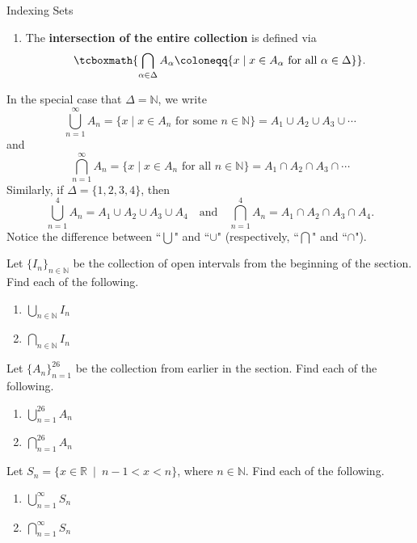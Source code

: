\begin{section}{Indexing Sets}
\begin{definition}
\begin{enumerate}[label=\textrm{(\alph*)}]
\item The \textbf{intersection of the entire collection} is defined via
\[
\tcboxmath{\bigcap_{\alpha\in\Delta} A_{\alpha}\coloneqq \{x\mid x\in A_{\alpha} \mbox{ for all }\alpha\in \Delta\}}.
\]
\end{enumerate}
\end{definition}

In the special case that $\Delta=\mathbb{N}$, we write
\[
\bigcup_{n=1}^{\infty}A_n= \{ x \mid  x \in A_n \mbox{ for some } n \in \mathbb{N}\}= A_1\cup A_2 \cup A_3 \cup \cdots
\] 
and
\[
\bigcap_{n=1}^{\infty}A_n= \{ x \mid  x \in A_n \mbox{ for all } n \in \mathbb{N}\} = A_1\cap A_2 \cap A_3 \cap \cdots
\] 
Similarly, if $\Delta=\{1,2,3,4\}$, then
\[
\bigcup_{n=1}^{4}A_n= A_1\cup A_2 \cup A_3 \cup A_4 \quad \text{and} \quad
\bigcap_{n=1}^{4}A_n= A_1\cap A_2 \cap A_3 \cap A_4.
\] 
Notice the difference between ``$\bigcup$" and ``$\cup$" (respectively, ``$\bigcap$" and ``$\cap$").  %

\begin{problem}
Let $\{I_n\}_{n\in\mathbb{N}}$ be the collection of open intervals from the beginning of the section.  Find each of the following.
\begin{enumerate}[label=\textrm{(\alph*)}]
\item $\displaystyle \bigcup_{n\in\mathbb{N}}I_n$
\item $\displaystyle \bigcap_{n\in\mathbb{N}}I_n$
\end{enumerate}
\end{problem}


\begin{problem}
Let $\{A_n\}_{n=1}^{26}$ be the collection from earlier in the section.  Find each of the following.
\begin{enumerate}[label=\textrm{(\alph*)}]
\item $\displaystyle \bigcup_{n=1}^{26}A_n$
\item $\displaystyle \bigcap_{n=1}^{26}A_n$
\end{enumerate}
\end{problem}

\begin{problem}
Let $S_n = \{x \in \mathbb{R} \ \mid  \ n-1<x<n \}$, where $n\in \mathbb{N}$.  Find each of the following.
\begin{enumerate}[label=\textrm{(\alph*)}]
\item $\displaystyle \bigcup_{n=1}^{\infty}S_n$
\item $\displaystyle \bigcap_{n=1}^{\infty}S_n$
\end{enumerate}
\end{problem}


\end{section}
